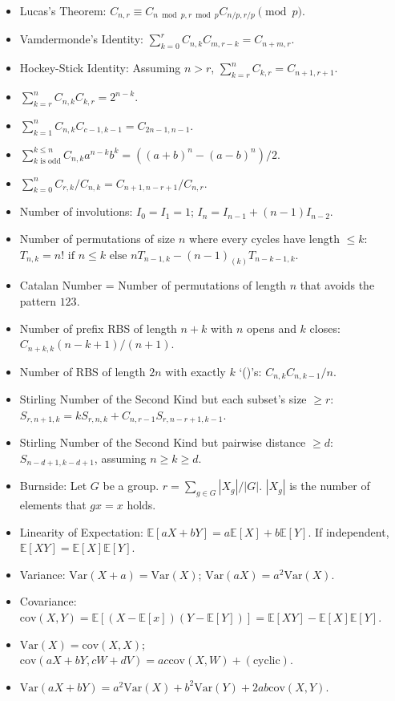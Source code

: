 \begin{itemize}
	\item Lucas's Theorem: $C_{n, r} \equiv C_{n \bmod p, r \bmod p} C_{n/p, r/p} \pmod p$.
	\item Vamdermonde's Identity: $\sum_{k=0}^{r} C_{n, k} C_{m, r-k} = C_{n+m, r}$.
	\item Hockey-Stick Identity: Assuming $n > r$, $\sum_{k=r}^{n} C_{k, r} = C_{n+1, r+1}$.
	\item $\sum_{k=r}^{n} C_{n, k} C_{k, r} = 2^{n-k}$.
	\item $\sum_{k=1}^{n} C_{n, k} C_{c-1, k-1} = C_{2n-1, n-1}$.
	\item $\sum_{k \text{ is odd}}^{k \le n} C_{n, k} a^{n-k} b^k = ((a+b)^n - (a-b)^n)/2$.
	\item $\sum_{k=0}^{n} C_{r, k} / C_{n, k} = C_{n+1, n-r+1} / C_{n, r}$.
	\item Number of involutions: $I_0 = I_1 = 1$; $I_{n} = I_{n-1} + (n-1) I_{n-2}$.
	\item Number of permutations of size $n$ where every cycles have length $\le k$: $T_{n,k} = n! \text{ if } n \le k \text{ else } n T_{n-1, k} - (n-1)_{(k)} T_{n-k-1, k}$.
	\item Catalan Number = Number of permutations of length $n$ that avoids the pattern $123$.
	\item Number of prefix RBS of length $n+k$ with $n$ opens and $k$ closes: $C_{n+k, k} (n-k+1)/(n+1)$.
	\item Number of RBS of length $2n$ with exactly $k$ `()'s: $C_{n, k} C_{n, k-1} / n$.
	\item Stirling Number of the Second Kind but each subset's size $\ge r$: \\ $S_{r, n+1, k} = k S_{r, n, k} + C_{n, r-1} S_{r, n-r+1, k-1}$.
	\item Stirling Number of the Second Kind but pairwise distance $\ge d$: $S_{n-d+1, k-d+1}$, assuming $n \ge k \ge d$.
	\item Burnside: Let $G$ be a group. $r = \sum_{g \in G} |X_g|/|G|$. $|X_g|$ is the number of elements that $gx = x$ holds.
	\item Linearity of Expectation: $\mathbb{E}[aX + bY] = a \mathbb{E}[X] + b \mathbb{E}[Y]$. If independent, $\mathbb{E}[XY] = \mathbb{E}[X] \mathbb{E}[Y]$.
	\item Variance: $\mathrm{Var}(X+a)= \mathrm{Var}(X)$; $\mathrm{Var}(aX) = a^2 \mathrm{Var}(X)$.
	\item Covariance: $\mathrm{cov}(X, Y) = \mathbb{E}[(X-\mathbb{E}[x])(Y-\mathbb{E}[Y])] = \mathbb{E}[XY] - \mathbb{E}[X] \mathbb{E}[Y]$.
	\item $\mathrm{Var}(X) = \mathrm{cov}(X, X)$; $\mathrm{cov}(aX + bY, cW + dV) = ac \mathrm{cov}(X, W) + (\text{cyclic})$.
	\item $\mathrm{Var}(aX + bY) = a^2 \mathrm{Var}(X) + b^2 \mathrm{Var}(Y) + 2ab \mathrm{cov}(X, Y)$.
\end{itemize}

